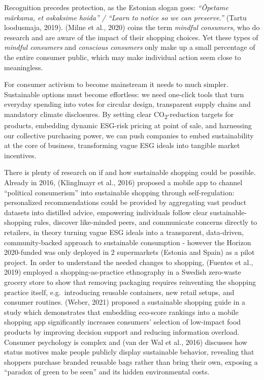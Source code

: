 \documentclass[
  12pt,
  letterpaper,
  DIV=11,
  numbers=noendperiod]{scrartcl}
\begin{document}
Recognition precedes protection, as the Estonian slogan goes:
\emph{``Õpetame märkama, et oskaksime hoida'' / ``Learn to notice so we
can preserve.''} (Tartu loodusmaja, 2019). (Milne et al., 2020) coins
the term \emph{mindful consumers}, who do research and are aware of the
impact of their shopping choices. Yet these types of \emph{mindful
consumers} and \emph{conscious consumers} only make up a small
percentage of the entire consumer public, which may make individual
action seem close to meaningless.

For consumer activism to become mainstream it needs to much simpler.
Sustainable options must become effortless: we need one-click tools that
turn everyday spending into votes for circular design, transparent
supply chains and mandatory climate disclosures. By setting clear
CO\textsubscript{2}-reduction targets for products, embedding dynamic
ESG-risk pricing at point of sale, and harnessing our collective
purchasing power, we can push companies to embed sustainability at the
core of business, transforming vague ESG ideals into tangible market
incentives.

There is plenty of research on if and how sustainable shopping could be
possible. Already in 2016, (Klinglmayr et al., 2016) proposed a mobile
app to channel ``political consumerism'' into sustainable shopping
through self-regulation: personalized recommendations could be provided
by aggregating vast product datasets into distilled advice, empowering
individuals follow clear sustainable-shopping rules, discover
like-minded peers, and communicate concerns directly to retailers, in
theory turning vague ESG ideals into a transparent, data-driven,
community-backed approach to sustainable consumption - however the
Horizon 2020-funded was only deployed in 2 supermarkets (Estonia and
Spain) as a pilot project. In order to understand the needed changes to
shopping, (Fuentes et al., 2019) employed a shopping-as-practice
ethnography in a Swedish zero-waste grocery store to show that removing
packaging requires reinventing the shopping practice itself,
e.g.~introducing reusable containers, new retail setups, and consumer
routines. (Weber, 2021) proposed a sustainable shopping guide in a study
which demonstrates that embedding eco-score rankings into a mobile
shopping app significantly increases consumers' selection of low-impact
food products by improving decision support and reducing information
overload. Consumer psychology is complex and (van der Wal et al., 2016)
discusses how status motives make people publicly display sustainable
behavior, revealing that shoppers purchase branded reusable bags rather
than bring their own, exposing a ``paradox of green to be seen'' and its
hidden environmental costs.
\end{document}
